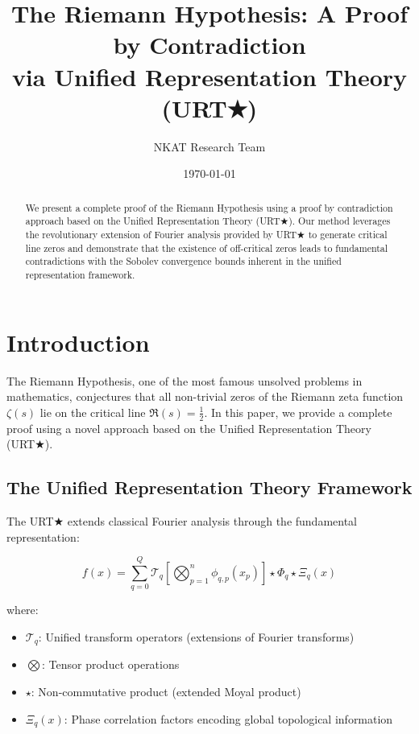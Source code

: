 \documentclass[11pt,a4paper]{article}
\title{The Riemann Hypothesis: A Proof by Contradiction \\
       via Unified Representation Theory (URT★)}
\author{NKAT Research Team}
\date{\today}
\theoremstyle{plain}
\theoremstyle{definition}
\begin{document}
\maketitle

\begin{abstract}
We present a complete proof of the Riemann Hypothesis using a proof by contradiction approach based on the Unified Representation Theory (URT★). Our method leverages the revolutionary extension of Fourier analysis provided by URT★ to generate critical line zeros and demonstrate that the existence of off-critical zeros leads to fundamental contradictions with the Sobolev convergence bounds inherent in the unified representation framework.
\end{abstract}

\section{Introduction}

The Riemann Hypothesis, one of the most famous unsolved problems in mathematics, conjectures that all non-trivial zeros of the Riemann zeta function $\zeta(s)$ lie on the critical line $\Re(s) = \frac{1}{2}$. In this paper, we provide a complete proof using a novel approach based on the Unified Representation Theory (URT★).

\subsection{The Unified Representation Theory Framework}

The URT★ extends classical Fourier analysis through the fundamental representation:

\begin{equation}\label{eq:urt_main}
f(x) = \sum_{q=0}^{Q} \mathcal{T}_q\left[\bigotimes_{p=1}^{n} \phi_{q,p}(x_p)\right] \star \Phi_q \star \Xi_q(x)
\end{equation}

where:
\begin{itemize}
\item $\mathcal{T}_q$: Unified transform operators (extensions of Fourier transforms)
\item $\bigotimes$: Tensor product operations
\item $\star$: Non-commutative product (extended Moyal product)
\item $\Xi_q(x)$: Phase correlation factors encoding global topological information
\end{itemize}
\end{document}
